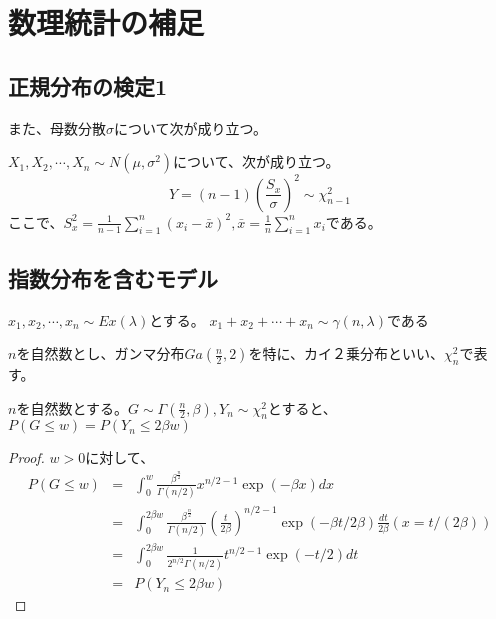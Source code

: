 
\chapter{数理統計の補足}

\section{正規分布の検定1}

また、母数分散$\sigma$について次が成り立つ。
\begin{theo}\label{normal_sigma_chi2}
    $X_1,X_2,\cdots,X_n \sim N(\mu,\sigma^2)$について、次が成り立つ。
    \begin{equation*}
        Y = (n-1)(\frac{S_x}{\sigma})^2 \sim \chi^2_{n-1}
    \end{equation*}
    ここで、$S^2_x=\frac{1}{n-1}\sum_{i=1}^n(x_i-\bar{x})^2,\bar{x}=\frac{1}{n}\sum_{i=1}^n x_i$である。
\end{theo}



\section{指数分布を含むモデル}

\begin{theo}
    $x_1,x_2,\cdots,x_n \sim Ex(\lambda)$とする。
    $x_1+x_2+\cdots+x_n \sim \gamma(n,\lambda)$である
\end{theo}

$n$を自然数とし、ガンマ分布$Ga(\frac{n}{2},2)$を特に、カイ２乗分布といい、$\chi ^2_n$で表す。

\begin{theo}
$n$を自然数とする。$G\sim\Gamma(\frac{n}{2},\beta),Y_n\sim \chi^2_n$とすると、$P(G\leq w) = P(Y_n \leq 2\beta w)$
\end{theo}
\begin{proof}
$w >0$に対して、
\begin{eqnarray*}
    P(G \leq w) &=& \int_0^w \frac{\beta^\frac{n}{2}}{\Gamma(n/2)}x^{n/2-1}\exp{(-\beta x)}dx \\
    &=&\int_0^{2\beta w} \frac{\beta^{\frac{n}{2}}}{\Gamma(n/2)}\left( \frac{t}{2\beta} \right)^{n/2-1}\exp{(-\beta t/2\beta)}\frac{dt}{2\beta} (x=t/(2\beta)) \\
    &=& \int_0^{2\beta w} \frac{1}{2^{n/2}\Gamma(n/2)}t^{n/2-1}\exp{(-t/2)}dt\\
    &=&P(Y_n \leq 2\beta w)
\end{eqnarray*}
\end{proof}


